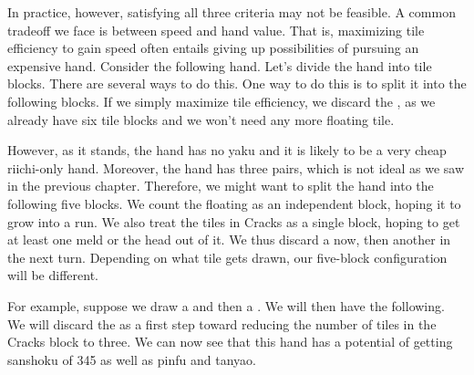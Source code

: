 \bigskip

In practice, however, satisfying all three criteria may not be feasible. A common tradeoff we face is between speed and hand value. That is, maximizing tile efficiency to gain speed often entails giving up possibilities of pursuing an expensive hand. Consider the following hand. 
\bp
{}
\ep
Let's divide the hand into tile blocks. There are several ways to do this. One way to do this is to split it into the following blocks. 
\emj
If we simply maximize tile efficiency, we discard the {\large{}}, as we already have six tile blocks and we won't need any more floating tile. 

\bigskip
However, as it stands, the hand has no {\jap yaku} and it is likely to be a very cheap {\jap riichi}-only hand. Moreover, the hand has three pairs, which is not ideal as we saw in the previous chapter. 
Therefore, we might want to split the hand into the following five blocks. 
\emj
We count the floating {\large{}} as an independent block, hoping it to grow into a run. We also treat the tiles in Cracks as a single block, hoping to get at least one meld or the head out of it. We thus discard a {\large{}} now, then another {\large{}} in the next turn. Depending on what tile gets drawn, our five-block configuration will be different. 

\bigskip
For example, suppose we draw a {\large{}} and then a {\large{}}. We will then have the following. 
\emj
We will discard the {\large{}} as a first step toward reducing the number of tiles in the Cracks block to three. We can now see that this hand has a potential of getting {\jap sanshoku} of 345 as well as {\jap pinfu} and {\jap tanyao}.

